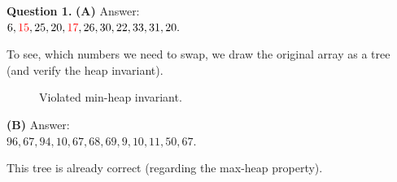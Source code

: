\documentclass[a4paper,12pt]{article}
\begin{document}
\newpage


\vspace{10pt}
{\bf Question 1.} {\bf (A)} Answer:\\
$6, \textcolor{red}{15}, 25, 20, \textcolor{red}{17}, 26, 30, 22, 33, 31, 20.$

To see, which numbers we need to swap, we draw the original 
array as a tree (and verify the heap invariant). 

\begin{figure}[!htb]
\caption{\label{fig:unsorted-heap} Violated min-heap invariant.}
\end{figure}

{\bf (B)} Answer:\\
$96, 67, 94, 10, 67, 68, 69,  9, 10, 11, 50, 67.$

This tree is already correct (regarding the max-heap property). 
\end{document}
